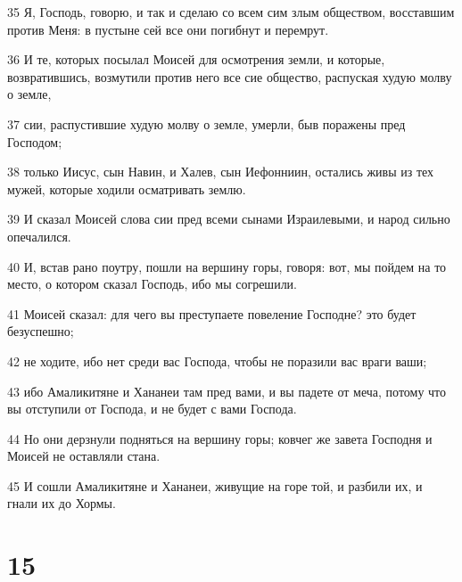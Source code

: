\par 35 Я, Господь, говорю, и так и сделаю со всем сим злым обществом, восставшим против Меня: в пустыне сей все они погибнут и перемрут.
\par 36 И те, которых посылал Моисей для осмотрения земли, и которые, возвратившись, возмутили против него все сие общество, распуская худую молву о земле,
\par 37 сии, распустившие худую молву о земле, умерли, быв поражены пред Господом;
\par 38 только Иисус, сын Навин, и Халев, сын Иефонниин, остались живы из тех мужей, которые ходили осматривать землю.
\par 39 И сказал Моисей слова сии пред всеми сынами Израилевыми, и народ сильно опечалился.
\par 40 И, встав рано поутру, пошли на вершину горы, говоря: вот, мы пойдем на то место, о котором сказал Господь, ибо мы согрешили.
\par 41 Моисей сказал: для чего вы преступаете повеление Господне? это будет безуспешно;
\par 42 не ходите, ибо нет среди вас Господа, чтобы не поразили вас враги ваши;
\par 43 ибо Амаликитяне и Хананеи там пред вами, и вы падете от меча, потому что вы отступили от Господа, и не будет с вами Господа.
\par 44 Но они дерзнули подняться на вершину горы; ковчег же завета Господня и Моисей не оставляли стана.
\par 45 И сошли Амаликитяне и Хананеи, живущие на горе той, и разбили их, и гнали их до Хормы.

\chapter{15}

